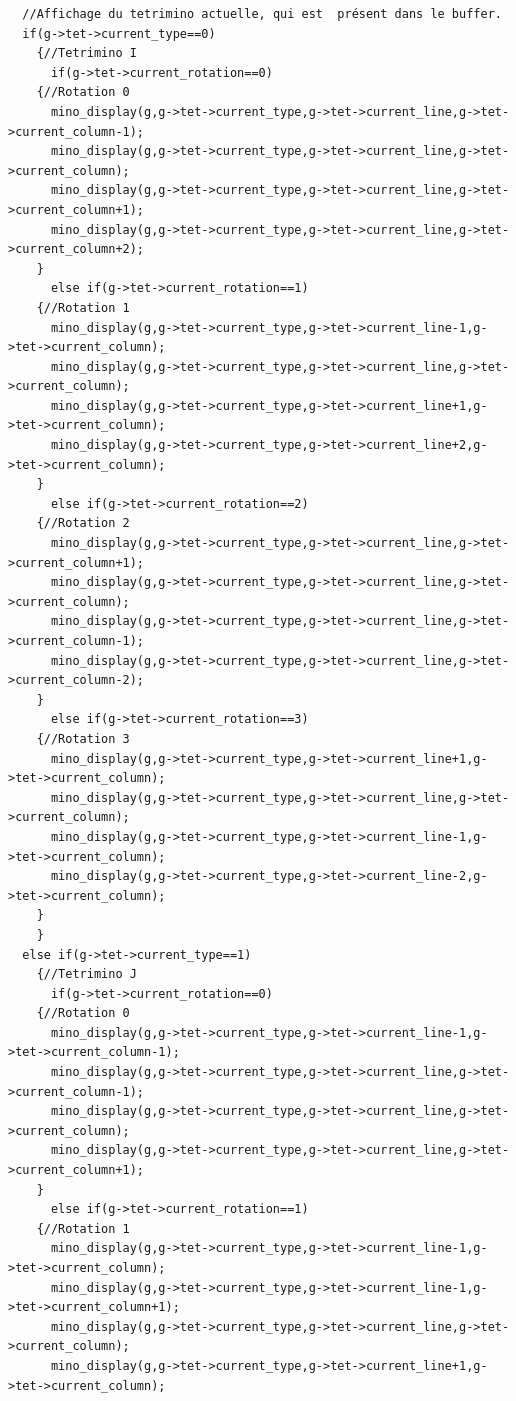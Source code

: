 \documentclass[a4paper,10p]{report}
\begin{document}
\begin{lstlisting}
  //Affichage du tetrimino actuelle, qui est  présent dans le buffer. 
  if(g->tet->current_type==0)
    {//Tetrimino I
      if(g->tet->current_rotation==0)
	{//Rotation 0
	  mino_display(g,g->tet->current_type,g->tet->current_line,g->tet->current_column-1);
	  mino_display(g,g->tet->current_type,g->tet->current_line,g->tet->current_column);
	  mino_display(g,g->tet->current_type,g->tet->current_line,g->tet->current_column+1);
	  mino_display(g,g->tet->current_type,g->tet->current_line,g->tet->current_column+2);
	}
      else if(g->tet->current_rotation==1)
	{//Rotation 1
	  mino_display(g,g->tet->current_type,g->tet->current_line-1,g->tet->current_column);
	  mino_display(g,g->tet->current_type,g->tet->current_line,g->tet->current_column);
	  mino_display(g,g->tet->current_type,g->tet->current_line+1,g->tet->current_column);
	  mino_display(g,g->tet->current_type,g->tet->current_line+2,g->tet->current_column);
	}
      else if(g->tet->current_rotation==2)
	{//Rotation 2
	  mino_display(g,g->tet->current_type,g->tet->current_line,g->tet->current_column+1);
	  mino_display(g,g->tet->current_type,g->tet->current_line,g->tet->current_column);
	  mino_display(g,g->tet->current_type,g->tet->current_line,g->tet->current_column-1);
	  mino_display(g,g->tet->current_type,g->tet->current_line,g->tet->current_column-2);
	}
      else if(g->tet->current_rotation==3)
	{//Rotation 3
	  mino_display(g,g->tet->current_type,g->tet->current_line+1,g->tet->current_column);
	  mino_display(g,g->tet->current_type,g->tet->current_line,g->tet->current_column);
	  mino_display(g,g->tet->current_type,g->tet->current_line-1,g->tet->current_column);
	  mino_display(g,g->tet->current_type,g->tet->current_line-2,g->tet->current_column);
	}
    }
  else if(g->tet->current_type==1)
    {//Tetrimino J
      if(g->tet->current_rotation==0)
	{//Rotation 0
	  mino_display(g,g->tet->current_type,g->tet->current_line-1,g->tet->current_column-1);
	  mino_display(g,g->tet->current_type,g->tet->current_line,g->tet->current_column-1);
	  mino_display(g,g->tet->current_type,g->tet->current_line,g->tet->current_column);
	  mino_display(g,g->tet->current_type,g->tet->current_line,g->tet->current_column+1);
	}
      else if(g->tet->current_rotation==1)
	{//Rotation 1
	  mino_display(g,g->tet->current_type,g->tet->current_line-1,g->tet->current_column);
	  mino_display(g,g->tet->current_type,g->tet->current_line-1,g->tet->current_column+1);
	  mino_display(g,g->tet->current_type,g->tet->current_line,g->tet->current_column);
	  mino_display(g,g->tet->current_type,g->tet->current_line+1,g->tet->current_column);

\end{lstlisting}
\end{document}

